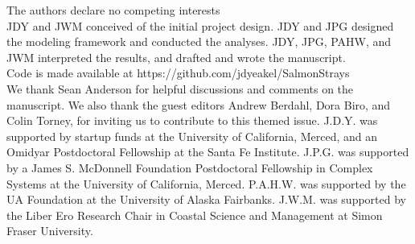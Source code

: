 \documentclass{revtex4}
\begin{document}
 The authors declare no competing interests
\\
 JDY and JWM conceived of the initial project design. JDY and JPG designed the modeling framework and conducted the analyses. JDY, JPG, PAHW, and JWM interpreted the results, and drafted and wrote the manuscript.
\\
 Code is made available at https://github.com/jdyeakel/SalmonStrays
\\
 We thank Sean Anderson for helpful discussions and comments on the manuscript. We also thank the guest editors Andrew Berdahl, Dora Biro, and Colin Torney, for inviting us to contribute to this themed issue. J.D.Y. was supported by startup funds at the University of California, Merced, and an Omidyar Postdoctoral Fellowship at the Santa Fe Institute. J.P.G. was supported by a James S. McDonnell Foundation Postdoctoral Fellowship in Complex Systems at the University of California, Merced. P.A.H.W. was supported by the UA Foundation at the University of Alaska Fairbanks. J.W.M. was supported by the Liber Ero Research Chair in Coastal Science and Management at Simon Fraser University.
\end{document}
